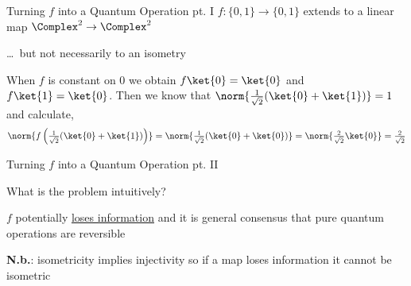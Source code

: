 \documentclass{beamer}
\begin{document}
\begin{frame}{Turning $f$ into a Quantum Operation pt. I}
        $f : \{0,1\} \to \{0,1\}$ extends to a linear map $\Complex^2 \to
        \Complex^2$

        \dots\ but not necessarily to an isometry

        \vfill
        \begin{example}
                When $f$ is constant on $0$ we obtain $f \ket{0} = \ket{0}$ and
                $f \ket{1} = \ket{0}$. Then we know that
                $\norm{ \frac{1}{\sqrt{2}} (\ket{0} + \ket{1}) } = 1$ and calculate,
                \[
                        \textstyle{ \norm{f \left 
                        ( \frac{1}{\sqrt{2}} (\ket{0} + \ket{1})\right ) } }
                        = \textstyle{ \norm{ 
                        \frac{1}{\sqrt{2}} (\ket{0} + \ket{0}) } }
                        = \textstyle{ \norm{ 
                        \frac{2}{\sqrt{2}} \ket{0} } } =
                        \textstyle{\frac{2}{\sqrt{2}}} 
                \]
        \end{example}
\end{frame}

\begin{frame}{Turning $f$ into a Quantum Operation pt. II}

        What is the problem intuitively?
        \pause

        $f$ potentially \alert{\underline{loses information}} and it is general
        consensus that pure quantum operations are reversible


        \vspace{0.8cm}
        \textbf{N.b.}: isometricity implies injectivity so if a map loses
        information it cannot be isometric
\end{frame}
\end{document}
